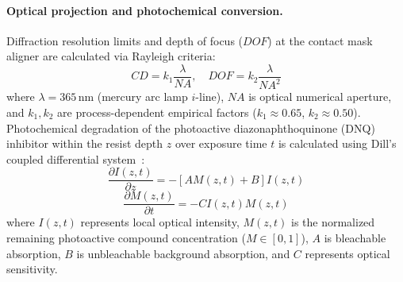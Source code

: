 \documentclass[10pt,a4paper,twocolumn]{article}
\begin{document}
\paragraph{Optical projection and photochemical conversion.}
Diffraction resolution limits and depth of focus ($DOF$) at the contact mask aligner are calculated via Rayleigh criteria:
\begin{equation}
CD = k_1 \frac{\lambda}{NA}, \quad DOF = k_2 \frac{\lambda}{NA^2}
\label{eq:rayleigh}
\end{equation}
where $\lambda = 365\,\text{nm}$ (mercury arc lamp $i$-line), $NA$ is optical numerical aperture, and $k_1, k_2$ are process-dependent empirical factors ($k_1 \approx 0.65$, $k_2 \approx 0.50$). Photochemical degradation of the photoactive diazonaphthoquinone (DNQ) inhibitor within the resist depth $z$ over exposure time $t$ is calculated using Dill's coupled differential system~\cite{dill1975optical}:
\begin{equation}
\frac{\partial I(z,t)}{\partial z} = - \left[ A M(z,t) + B \right] I(z,t)
\label{eq:dill1}
\end{equation}
\begin{equation}
\frac{\partial M(z,t)}{\partial t} = - C I(z,t) M(z,t)
\label{eq:dill2}
\end{equation}
where $I(z,t)$ represents local optical intensity, $M(z,t)$ is the normalized remaining photoactive compound concentration ($M \in [0,1]$), $A$ is bleachable absorption, $B$ is unbleachable background absorption, and $C$ represents optical sensitivity.
\end{document}
